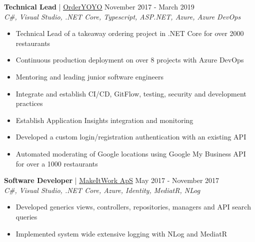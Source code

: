 \documentclass[margin, 10pt, hidelinks]{res} %
\newcommand{\emphasize}{\bf} %
\begin{document}
\begin{resume}
    {\emphasize Technical Lead} | \href{https://orderyoyo.com/}{\underline{OrderYOYO}}    \hfill November 2017 - March 2019  \\
    {\it C\#, Visual Studio, .NET Core, Typescript, ASP.NET, Azure, Azure DevOps} %
    \begin{itemize} \setlength{\itemindent}{-0.1in}\itemsep 0pt %
        \item Technical Lead of a takeaway ordering project in .NET Core for over 2000 restaurants
        \item Continuous production deployment on over 8 projects with Azure DevOps
        \item Mentoring and leading junior software engineers
        \item Integrate and establish  CI/CD, GitFlow, testing, security and development practices
        \item Establish Application Insights integration and monitoring
        \item Developed a custom login/registration authentication with an existing API
        \item Automated moderating of Google locations using Google My Business API for over a 1000 restaurants
    \end{itemize}

    {\emphasize Software Developer} | \href{http://www.makeitwork.dk}{\underline{MakeItWork ApS}}  \hfill May 2017 - November 2017  \\
    {\it C\#, Visual Studio, .NET Core, Azure, Identity, MediatR, NLog  } %
    \begin{itemize} \setlength{\itemindent}{-0.1in}\itemsep 0pt %
        \item Developed generics views, controllers, repositories, managers and API search queries
        \item Implemented system wide extensive logging with NLog and MediatR
    \end{itemize}


\end{resume}
\end{document}
